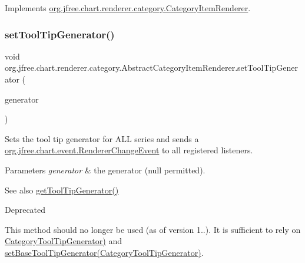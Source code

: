 Implements \mbox{\hyperlink{interfaceorg_1_1jfree_1_1chart_1_1renderer_1_1category_1_1_category_item_renderer_a5015519bf531ff5a7f4e165c84f192cb}{org.\+jfree.\+chart.\+renderer.\+category.\+Category\+Item\+Renderer}}.

\mbox{\label{classorg_1_1jfree_1_1chart_1_1renderer_1_1category_1_1_abstract_category_item_renderer_a19ad9dfc587403a06c97595c3f28800a}} 
\subsubsection{\texorpdfstring{set\+Tool\+Tip\+Generator()}{setToolTipGenerator()}}
{\footnotesize\ttfamily void org.\+jfree.\+chart.\+renderer.\+category.\+Abstract\+Category\+Item\+Renderer.\+set\+Tool\+Tip\+Generator (\begin{DoxyParamCaption}\item[{\mbox{\hyperlink{interfaceorg_1_1jfree_1_1chart_1_1labels_1_1_category_tool_tip_generator}{Category\+Tool\+Tip\+Generator}}}]{generator }\end{DoxyParamCaption})}

Sets the tool tip generator for A\+LL series and sends a \mbox{\hyperlink{classorg_1_1jfree_1_1chart_1_1event_1_1_renderer_change_event}{org.\+jfree.\+chart.\+event.\+Renderer\+Change\+Event}} to all registered listeners.


\begin{DoxyParams}{Parameters}
{\em generator} & the generator ({\ttfamily null} permitted).\\
\hline
\end{DoxyParams}
\begin{DoxySeeAlso}{See also}
\mbox{\hyperlink{classorg_1_1jfree_1_1chart_1_1renderer_1_1category_1_1_abstract_category_item_renderer_a82f173869f7f55aa7ca6bf59a58dac6f}{get\+Tool\+Tip\+Generator()}}
\end{DoxySeeAlso}
\begin{DoxyRefDesc}{Deprecated}
\item[\mbox{\hyperlink{deprecated__deprecated000151}{Deprecated}}]This method should no longer be used (as of version 1..). It is sufficient to rely on \mbox{\hyperlink{}{Category\+Tool\+Tip\+Generator)}} and \mbox{\hyperlink{classorg_1_1jfree_1_1chart_1_1renderer_1_1category_1_1_abstract_category_item_renderer_ab6112bf842d0a0e3324c1f657d24be9c}{set\+Base\+Tool\+Tip\+Generator(\+Category\+Tool\+Tip\+Generator)}}. \end{DoxyRefDesc}


